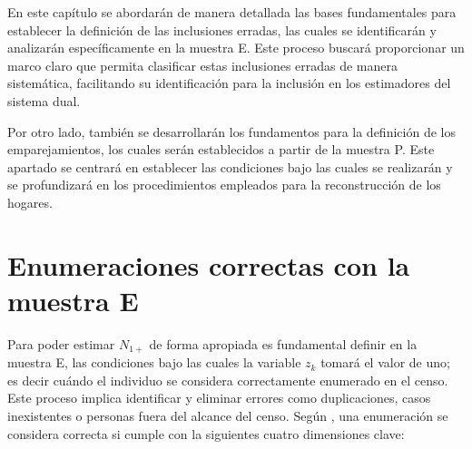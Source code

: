 \documentclass[
  12pt,
]{book}
\begin{document}
En este capítulo se abordarán de manera detallada las bases fundamentales para establecer la definición de las inclusiones erradas, las cuales se identificarán y analizarán específicamente en la muestra E. Este proceso buscará proporcionar un marco claro que permita clasificar estas inclusiones erradas de manera sistemática, facilitando su identificación para la inclusión en los estimadores del sistema dual.

Por otro lado, también se desarrollarán los fundamentos para la definición de los emparejamientos, los cuales serán establecidos a partir de la muestra P. Este apartado se centrará en establecer las condiciones bajo las cuales se realizarán y se profundizará en los procedimientos empleados para la reconstrucción de los hogares.

\hypertarget{enumeraciones-correctas-con-la-muestra-e}{%
\section{Enumeraciones correctas con la muestra E}\label{enumeraciones-correctas-con-la-muestra-e}}

Para poder estimar \(N_{1+}\) de forma apropiada es fundamental definir en la muestra E, las condiciones bajo las cuales la variable \(z_{k}\) tomará el valor de uno; es decir cuándo el individuo se considera correctamente enumerado en el censo. Este proceso implica identificar y eliminar errores como duplicaciones, casos inexistentes o personas fuera del alcance del censo. Según \citet{hogan2003}, una enumeración se considera correcta si cumple con la siguientes cuatro dimensiones clave:
\end{document}
